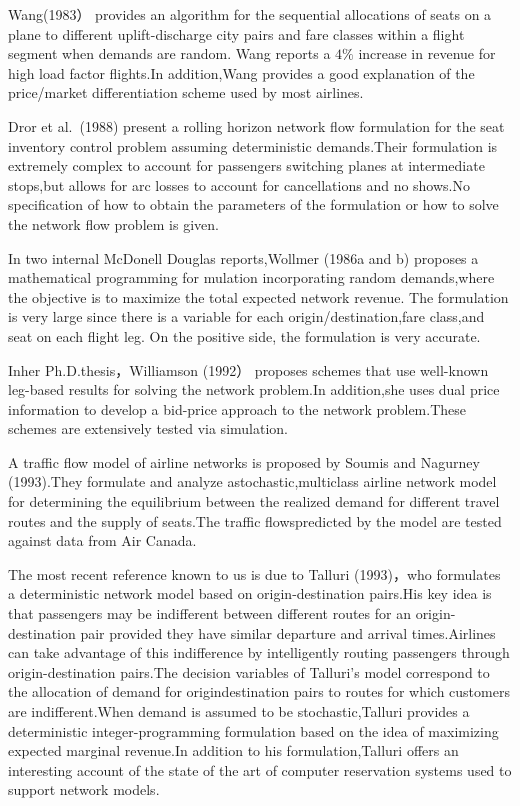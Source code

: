 Wang(1983） provides an algorithm for the sequential allocations of
seats on a plane to different uplift-discharge city pairs and fare
classes within a flight segment when demands are random. Wang reports a
\(4 \%\) increase in revenue for high load factor flights.In
addition,Wang provides a good explanation of the price/market
differentiation scheme used by most airlines.

Dror et al.~(1988) present a rolling horizon network flow formulation
for the seat inventory control problem assuming deterministic
demands.Their formulation is extremely complex to account for passengers
switching planes at intermediate stops,but allows for arc losses to
account for cancellations and no shows.No specification of how to obtain
the parameters of the formulation or how to solve the network flow
problem is given.

In two internal McDonell Douglas reports,Wollmer (1986a and b) proposes
a mathematical programming for mulation incorporating random
demands,where the objective is to maximize the total expected network
revenue. The formulation is very large since there is a variable for
each origin/destination,fare class,and seat on each flight leg. On the
positive side, the formulation is very accurate.

Inher Ph.D.thesis，Williamson (1992） proposes schemes that use
well-known leg-based results for solving the network problem.In
addition,she uses dual price information to develop a bid-price approach
to the network problem.These schemes are extensively tested via
simulation.

A traffic flow model of airline networks is proposed by Soumis and
Nagurney (1993).They formulate and analyze astochastic,multiclass
airline network model for determining the equilibrium between the
realized demand for different travel routes and the supply of seats.The
traffic flowspredicted by the model are tested against data from Air
Canada.

The most recent reference known to us is due to Talluri (1993)，who
formulates a deterministic network model based on origin-destination
pairs.His key idea is that passengers may be indifferent between
different routes for an origin-destination pair provided they have
similar departure and arrival times.Airlines can take advantage of this
indifference by intelligently routing passengers through
origin-destination pairs.The decision variables of Talluri's model
correspond to the allocation of demand for origindestination pairs to
routes for which customers are indifferent.When demand is assumed to be
stochastic,Talluri provides a deterministic integer-programming
formulation based on the idea of maximizing expected marginal revenue.In
addition to his formulation,Talluri offers an interesting account of the
state of the art of computer reservation systems used to support network
models.

